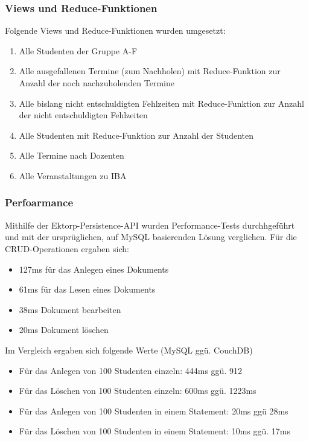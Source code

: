 \subsubsection{Views und Reduce-Funktionen}
Folgende Views und Reduce-Funktionen wurden umgesetzt:
\begin{enumerate}
\item  Alle Studenten der Gruppe A-F
\item Alle ausgefallenen Termine (zum Nachholen)  mit Reduce-Funktion zur Anzahl der noch nachzuholenden Termine
\item Alle bislang nicht entschuldigten Fehlzeiten mit Reduce-Funktion zur Anzahl der nicht entschuldigten Fehlzeiten
\item Alle Studenten  mit Reduce-Funktion zur Anzahl der Studenten
\item Alle Termine nach Dozenten
\item Alle Veranstaltungen zu IBA
\end{enumerate}

\subsubsection{Perfoarmance}
Mithilfe der Ektorp-Persistence-API wurden Performance-Tests durchhgeführt und mit der ursprüglichen, auf MySQL basierenden Lösung verglichen.
Für die CRUD-Operationen ergaben sich:
\begin{itemize}
    \item  127ms für das Anlegen eines Dokuments
    \item 61ms für das Lesen eines Dokuments
    \item 38ms Dokument bearbeiten
    \item 20ms Dokument löschen
\end{itemize}
Im Vergleich ergaben sich folgende Werte (MySQL ggü. CouchDB)
\begin{itemize}
    \item   Für das Anlegen von 100 Studenten einzeln: 444ms ggü. 912
    \item Für das Löschen von 100 Studenten einzeln: 600ms ggü. 1223ms
    \item Für das Anlegen von 100 Studenten in einem Statement: 20ms ggü 28ms
    \item Für das Löschen von 100 Studenten in einem Statement: 10ms ggü. 17ms
\end{itemize}
